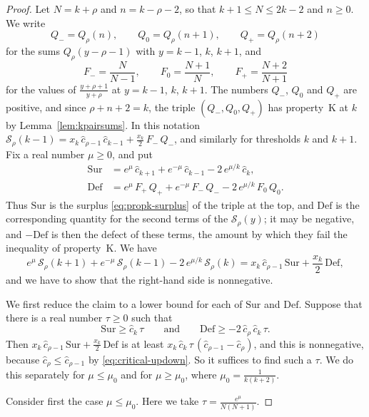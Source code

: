 \documentclass{amsart}
\theoremstyle{definition}
\theoremstyle{remark}
\numberwithin{equation}{section}
\begin{document}
\begin{proof}
Let $N=k+\rho$ and $n=k-\rho-2$, so that $k+1\le N\le 2k-2$ and $n\ge 0$. We write
\[
Q_-=Q_\rho(n),\qquad Q_0=Q_\rho(n+1),\qquad Q_+=Q_\rho(n+2)
\]
for the sums $Q_\rho(y-\rho-1)$ with $y=k-1$, $k$, $k+1$, and
\[
F_-=\frac{N}{N-1},\qquad F_0=\frac{N+1}{N},\qquad F_+=\frac{N+2}{N+1}
\]
for the values of $\frac{y+\rho+1}{y+\rho}$ at $y=k-1$, $k$, $k+1$. The numbers $Q_-$, $Q_0$ and $Q_+$ are positive, and since $\rho+n+2=k$, the triple $(Q_-,Q_0,Q_+)$ has property~K at $k$ by Lemma~\ref{lem:kpairsums}. In this notation $\mathcal S_\rho(k-1)=x_k\,\hat c_{\rho-1}\,\hat c_{k-1}+\frac{x_k}{2}\,F_-\,Q_-$, and similarly for thresholds $k$ and $k+1$. Fix a real number $\mu\ge 0$, and put
\begin{align*}
\mathrm{Sur}&=e^{\mu}\,\hat c_{k+1}+e^{-\mu}\,\hat c_{k-1}-2\,e^{\mu/k}\,\hat c_k,\\
\mathrm{Def}&=e^{\mu}\,F_+\,Q_++e^{-\mu}\,F_-\,Q_--2\,e^{\mu/k}\,F_0\,Q_0.
\end{align*}
Thus $\mathrm{Sur}$ is the surplus \eqref{eq:propk-surplus} of the triple at the top, and $\mathrm{Def}$ is the corresponding quantity for the second terms of the $\mathcal S_\rho(y)$; it may be negative, and $-\mathrm{Def}$ is then the defect of these terms, the amount by which they fail the inequality of property~K. We have
\[
e^{\mu}\,\mathcal S_\rho(k+1)+e^{-\mu}\,\mathcal S_\rho(k-1)-2\,e^{\mu/k}\,\mathcal S_\rho(k)=x_k\,\hat c_{\rho-1}\,\mathrm{Sur}+\frac{x_k}{2}\,\mathrm{Def},
\]
and we have to show that the right-hand side is nonnegative.

We first reduce the claim to a lower bound for each of $\mathrm{Sur}$ and $\mathrm{Def}$. Suppose that there is a real number $\tau\ge 0$ such that
\begin{equation}\label{eq:propk-tau}
\mathrm{Sur}\ge\hat c_k\,\tau\qquad\text{and}\qquad\mathrm{Def}\ge-2\,\hat c_\rho\,\hat c_k\,\tau.
\end{equation}
Then $x_k\,\hat c_{\rho-1}\,\mathrm{Sur}+\frac{x_k}{2}\,\mathrm{Def}$ is at least $x_k\,\hat c_k\,\tau\,(\hat c_{\rho-1}-\hat c_\rho)$, and this is nonnegative, because $\hat c_\rho\le\hat c_{\rho-1}$ by \eqref{eq:critical-updown}. So it suffices to find such a $\tau$. We do this separately for $\mu\le\mu_0$ and for $\mu\ge\mu_0$, where $\mu_0=\frac{1}{k(k+2)}$.

Consider first the case $\mu\le\mu_0$. Here we take $\tau=\frac{e^{\mu}}{N(N+1)}$.


\end{proof}
\end{document}
